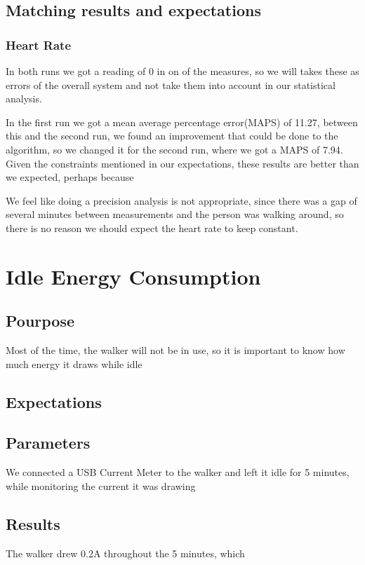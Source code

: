 	\subsection{Matching results and expectations}
		\subsubsection{Heart Rate}
			In both runs we got a reading of 0 in on of the measures, so we will takes these as errors of the overall system and not take them into account in our statistical analysis.

			In the first run we got a mean average percentage error(MAPS) of 11.27, between this and the second run, we found an improvement that could be done to the algorithm, so we changed it for the second run, where we got a MAPS of 7.94. Given the constraints mentioned in our expectations, these results are better than we expected, perhaps because %

			We feel like doing a precision analysis is not appropriate, since there was a gap of several minutes between measurements and the person was walking around, so there is no reason we should expect the heart rate to keep constant.


\section{Idle Energy Consumption}

	\subsection{Pourpose}
		Most of the time, the walker will not be in use, so it is important to know how much energy it draws while idle
	\subsection{Expectations}

	\subsection{Parameters}
		We connected a USB Current Meter to the walker and left it idle for 5 minutes, while monitoring the current it was drawing
	\subsection{Results}
		The walker drew 0.2A throughout the 5 minutes, which
